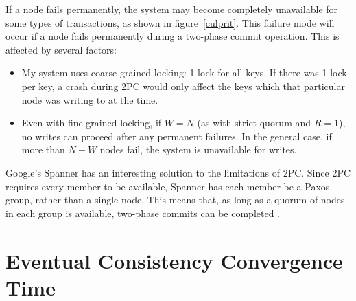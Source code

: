 \documentclass[12pt,a4paper,twoside,openany]{report}
\begin{document}
If a node fails permanently, the system may become completely unavailable for some types of transactions, as shown in figure~\ref{culprit}. This failure mode will occur if a node fails permanently during a two-phase commit operation. This is affected by several factors:

\begin{itemize}
\item
My system uses coarse-grained locking: 1 lock for all keys. If there was 1 lock per key, a crash during 2PC would only affect the keys which that particular node was writing to at the time.

\item
Even with fine-grained locking, if $W = N$ (as with strict quorum and $R = 1$), no writes can proceed after any permanent failures. In the general case, if more than $N - W$ nodes fail, the system is unavailable for writes.

\end{itemize}

Google's Spanner has an interesting solution to the limitations of 2PC. Since 2PC requires every member to be available, Spanner has each member be a Paxos group, rather than a single node. This means that, as long as a quorum of nodes in each group is available, two-phase commits can be completed \cite{45855}.


\section{Eventual Consistency Convergence Time}
\end{document}
